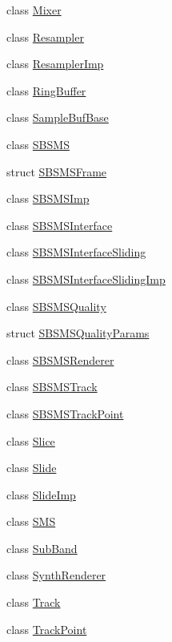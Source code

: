 \begin{DoxyCompactItemize}
\item 
class \hyperlink{class__sbsms___1_1_mixer}{Mixer}
\item 
class \hyperlink{class__sbsms___1_1_resampler}{Resampler}
\item 
class \hyperlink{class__sbsms___1_1_resampler_imp}{Resampler\+Imp}
\item 
class \hyperlink{class__sbsms___1_1_ring_buffer}{Ring\+Buffer}
\item 
class \hyperlink{class__sbsms___1_1_sample_buf_base}{Sample\+Buf\+Base}
\item 
class \hyperlink{class__sbsms___1_1_s_b_s_m_s}{S\+B\+S\+MS}
\item 
struct \hyperlink{struct__sbsms___1_1_s_b_s_m_s_frame}{S\+B\+S\+M\+S\+Frame}
\item 
class \hyperlink{class__sbsms___1_1_s_b_s_m_s_imp}{S\+B\+S\+M\+S\+Imp}
\item 
class \hyperlink{class__sbsms___1_1_s_b_s_m_s_interface}{S\+B\+S\+M\+S\+Interface}
\item 
class \hyperlink{class__sbsms___1_1_s_b_s_m_s_interface_sliding}{S\+B\+S\+M\+S\+Interface\+Sliding}
\item 
class \hyperlink{class__sbsms___1_1_s_b_s_m_s_interface_sliding_imp}{S\+B\+S\+M\+S\+Interface\+Sliding\+Imp}
\item 
class \hyperlink{class__sbsms___1_1_s_b_s_m_s_quality}{S\+B\+S\+M\+S\+Quality}
\item 
struct \hyperlink{struct__sbsms___1_1_s_b_s_m_s_quality_params}{S\+B\+S\+M\+S\+Quality\+Params}
\item 
class \hyperlink{class__sbsms___1_1_s_b_s_m_s_renderer}{S\+B\+S\+M\+S\+Renderer}
\item 
class \hyperlink{class__sbsms___1_1_s_b_s_m_s_track}{S\+B\+S\+M\+S\+Track}
\item 
class \hyperlink{class__sbsms___1_1_s_b_s_m_s_track_point}{S\+B\+S\+M\+S\+Track\+Point}
\item 
class \hyperlink{class__sbsms___1_1_slice}{Slice}
\item 
class \hyperlink{class__sbsms___1_1_slide}{Slide}
\item 
class \hyperlink{class__sbsms___1_1_slide_imp}{Slide\+Imp}
\item 
class \hyperlink{class__sbsms___1_1_s_m_s}{S\+MS}
\item 
class \hyperlink{class__sbsms___1_1_sub_band}{Sub\+Band}
\item 
class \hyperlink{class__sbsms___1_1_synth_renderer}{Synth\+Renderer}
\item 
class \hyperlink{class__sbsms___1_1_track}{Track}
\item 
class \hyperlink{class__sbsms___1_1_track_point}{Track\+Point}
\end{DoxyCompactItemize}
